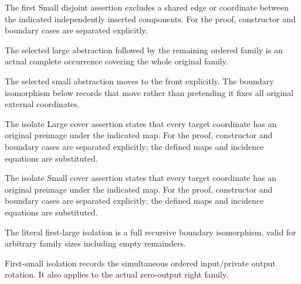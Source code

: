 The first Small disjoint assertion excludes a shared edge or coordinate between the indicated independently inserted components.
For the proof, constructor and boundary cases are separated explicitly.
\par{}

The selected large abstraction followed by the remaining ordered family is an actual complete occurrence covering the whole original family.
\par{}

The selected small abstraction moves to the front explicitly. The boundary isomorphism below records that move rather than pretending it fixes all original external coordinates.
\par{}

The isolate Large cover assertion states that every target coordinate has an original preimage under the indicated map.
For the proof, constructor and boundary cases are separated explicitly; the defined maps and incidence equations are substituted.
\par{}

The isolate Small cover assertion states that every target coordinate has an original preimage under the indicated map.
For the proof, constructor and boundary cases are separated explicitly; the defined maps and incidence equations are substituted.
\par{}

The literal first-large isolation is a full recursive boundary isomorphism, valid for arbitrary family sizes including empty remainders.
\par{}

First-small isolation records the simultaneous ordered input/private output rotation. It also applies to the actual zero-output right family.
\par{}

